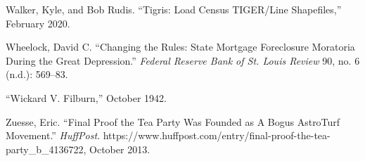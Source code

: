 \documentclass[12pt,oneside]{psthesis}
\begin{document}
\leavevmode\hypertarget{ref-walker2020tigris}{}%
Walker, Kyle, and Bob Rudis. ``Tigris: Load Census TIGER/Line Shapefiles,'' February 2020.

\leavevmode\hypertarget{ref-wheelockChangingRulesState2008}{}%
Wheelock, David C. ``Changing the Rules: State Mortgage Foreclosure Moratoria During the Great Depression.'' \emph{Federal Reserve Bank of St. Louis Review} 90, no. 6 (n.d.): 569--83.

\leavevmode\hypertarget{ref-1942wickard}{}%
``Wickard V. Filburn,'' October 1942.

\leavevmode\hypertarget{ref-zuesse2013final}{}%
Zuesse, Eric. ``Final Proof the Tea Party Was Founded as A Bogus AstroTurf Movement.'' \emph{HuffPost}. https://www.huffpost.com/entry/final-proof-the-tea-party\_b\_4136722, October 2013.


\end{document}
